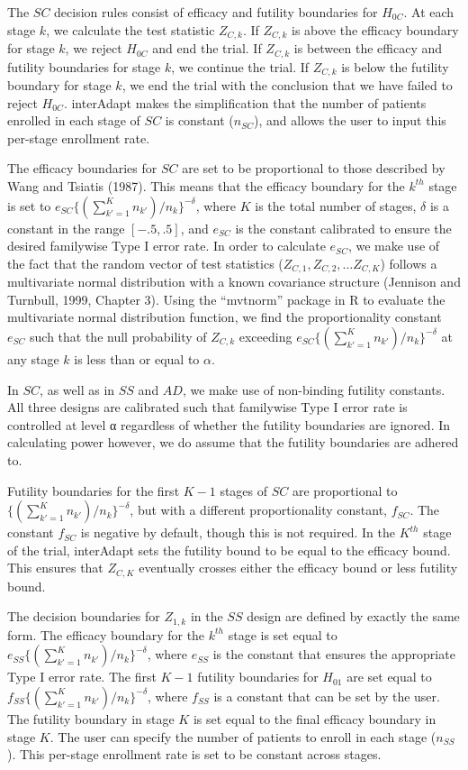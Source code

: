 \documentclass{article}
\newcommand{\interAdapt}{\textsf{interAdapt }}
\begin{document}
The $SC$ decision rules consist of efficacy and futility boundaries for $H_{0C}$. At each stage $k$, we calculate the test statistic $Z_{C,k}$. If $Z_{C,k}$ is above the efficacy boundary for stage $k$, we reject $H_{0C}$ and end the trial. If $Z_{C,k}$ is between the efficacy and futility boundaries for stage $k$, we continue the trial. If $Z_{C,k}$ is below the futility boundary for stage $k$, we end the trial with the conclusion that we have failed to reject $H_{0C}$. \interAdapt makes the simplification that the number of patients enrolled in each stage of $SC$ is constant ($n_{SC}$), and allows the user to input this per-stage enrollment rate.

The efficacy boundaries for $SC$ are set to be proportional to those described by Wang and Tsiatis (1987). This means that the efficacy boundary for the $k^{th}$ stage is set to $e_{SC}\{(\sum_{k'=1}^{K} n_{k'})/n_k\}^{-δ}$, where $K$ is the total number of stages, $δ$ is a constant in the range $[-.5,.5]$, and $e_{SC}$ is the constant calibrated to ensure the desired familywise Type I error rate. In order to calculate $e_{SC}$, we make use of the fact that the random vector of test statistics ($Z_{C,1},Z_{C,2},…Z_{C,K}$) follows a multivariate normal distribution with a known covariance structure (Jennison and Turnbull, 1999, Chapter 3)\cite{JennisonTurnbullBook}.
Using the ``mvtnorm'' package \cite{mvtnorm} in R to evaluate the multivariate normal distribution function, we find the proportionality constant $e_{SC}$ such that the null probability of $Z_{C,k}$ exceeding $e_{SC}\{(\sum_{k'=1}^{K} n_{k'})/n_k\}^{-δ}$ at any stage $k$ is less than or equal to $α$.

In $SC$, as well as in $SS$ and $AD$, we make use of non-binding futility constants. All three designs are calibrated such that familywise Type I error rate is controlled at level α regardless of whether the futility boundaries are ignored. In calculating power however, we do assume that the futility boundaries are adhered to.

Futility boundaries for the first $K-1$ stages of $SC$ are proportional to $\{(\sum_{k'=1}^{K} n_{k'})/n_k\}^{-δ}$, but with a different proportionality constant, $f_{SC}$. The constant $f_{SC}$ is negative by default, though this is not required. In the $K ^{th}$ stage of the trial, \interAdapt sets the futility bound to be equal to the efficacy bound. This ensures that $Z_{C,K}$ eventually crosses either the efficacy bound or less futility bound.

The decision boundaries for $Z_{1,k}$ in the $SS$ design are defined by exactly the same form. The efficacy boundary for the $k^{th}$ stage is set equal to $e_{SS}\{(\sum_{k'=1}^{K} n_{k'})/n_k\}^{-δ}$, where $e_{SS}$ is the constant that ensures the appropriate Type I error rate. The first $K-1$ futility boundaries for $H_{01}$ are set equal to $f_{SS}\{(\sum_{k'=1}^{K} n_{k'})/n_k\}^{-δ}$,  where $f_{SS}$ is a constant that can be set by the user. The futility boundary in stage $K$ is set equal to the final efficacy boundary in stage $K$. The user can specify the number of patients to enroll in each stage ($n_{SS}$). This per-stage enrollment rate is set to be constant across stages.
\end{document}

